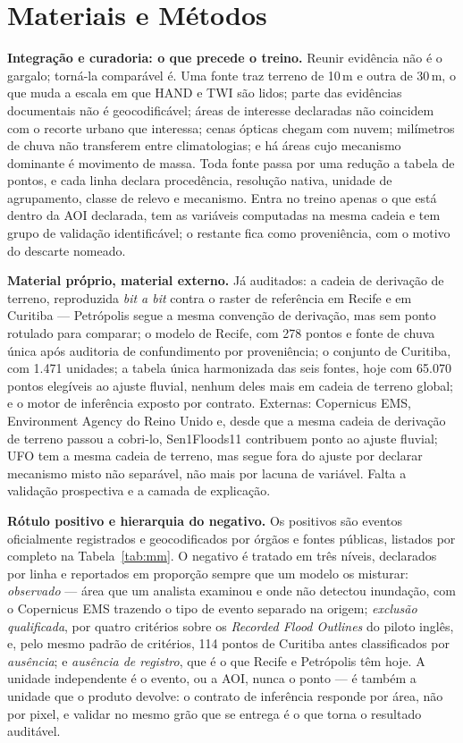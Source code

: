 \documentclass[conference]{IEEEtran}
\begin{document}
\section{Materiais e Métodos}

\textbf{Integração e curadoria: o que precede o treino.} Reunir evidência não é o
gargalo; torná-la comparável é. Uma fonte traz terreno de 10\,m e outra de 30\,m,
o que muda a escala em que HAND e TWI são lidos; parte das evidências documentais
não é geocodificável; áreas de interesse declaradas não coincidem com o recorte
urbano que interessa; cenas ópticas chegam com nuvem; milímetros de chuva não
transferem entre climatologias; e há áreas cujo mecanismo dominante é movimento
de massa. Toda fonte passa por uma
redução a tabela de pontos, e cada linha declara procedência, resolução nativa,
unidade de agrupamento, classe de relevo e mecanismo. Entra no treino apenas o
que está dentro da AOI declarada, tem as variáveis computadas na mesma cadeia e
tem grupo de validação identificável; o restante fica como proveniência, com o
motivo do descarte nomeado.

\textbf{Material próprio, material externo.} Já auditados: a cadeia de derivação
de terreno, reproduzida \emph{bit a bit} contra o raster de referência em Recife
e em Curitiba --- Petrópolis segue a mesma convenção de derivação, mas sem ponto
rotulado para comparar; o modelo de Recife, com 278 pontos e fonte de chuva
única após auditoria de confundimento por proveniência; o conjunto de
Curitiba, com 1.471 unidades; a tabela única harmonizada das seis fontes, hoje
com 65.070 pontos elegíveis ao ajuste fluvial, nenhum deles mais em cadeia de
terreno global; e o motor de inferência exposto por contrato. Externas:
Copernicus EMS, Environment Agency do Reino Unido e, desde que a mesma cadeia
de derivação de terreno passou a cobri-lo, Sen1Floods11 contribuem ponto ao
ajuste fluvial; UFO tem a mesma cadeia de terreno, mas segue fora do ajuste
por declarar mecanismo misto não separável, não mais por lacuna de variável.
Falta a validação prospectiva e a camada de explicação.

\textbf{Rótulo positivo e hierarquia do negativo.} Os positivos são eventos
oficialmente registrados e geocodificados por órgãos e fontes públicas,
listados por completo na Tabela~\ref{tab:mm}. O
negativo é tratado em três níveis, declarados por linha e reportados em proporção
sempre que um modelo os misturar: \emph{observado} --- área que um analista
examinou e onde não detectou inundação, com o Copernicus EMS trazendo o tipo de
evento separado na origem; \emph{exclusão qualificada}, por quatro critérios
sobre os \emph{Recorded Flood Outlines} do piloto inglês, e, pelo mesmo
padrão de critérios, 114 pontos de Curitiba antes classificados por
\emph{ausência}; e \emph{ausência de registro}, que é o que Recife e
Petrópolis têm hoje. A unidade
independente é o evento, ou a AOI, nunca o ponto --- é também a unidade que o
produto devolve: o contrato de inferência responde por área, não por pixel, e
validar no mesmo grão que se entrega é o que torna o resultado auditável.
\end{document}
